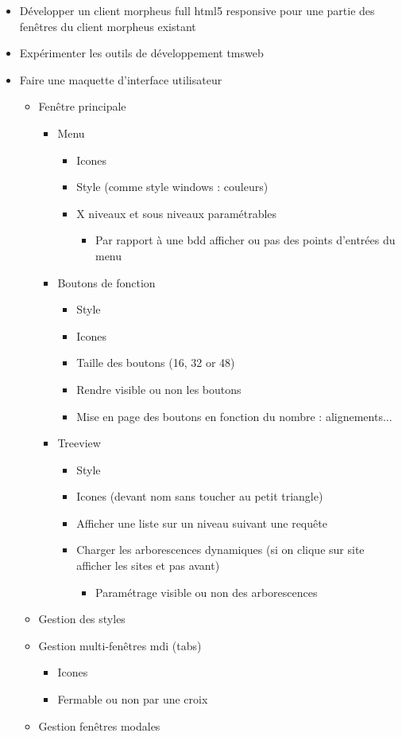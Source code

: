 \documentclass[a4paper, 12pt, french]{article}
\newcommand{\bdot}{\item[\color{ssiYellow}\ding{108}]}
\newcommand{\bdotoutlined}{\item[\color{ssiYellow}\ding{109}]}
\newcommand{\bsquare}{\item[\color{ssiYellow}\ding{110}]}
\newcommand{\bsquareoutlined}{\item[\color{ssiYellow}\ding{111}]}
\newcommand{\bdiamond}{\item[\color{ssiYellow}\ding{117}]}
\begin{document}
					\begin{itemize}
						\bdot{Développer un client morpheus full \gls{html}5 responsive pour une partie des fenêtres du client morpheus existant}
						\bdot{Expérimenter les outils de développement \gls{tmsweb}}
						\bdot{Faire une maquette d'interface utilisateur}
							\begin{itemize}
								\bdotoutlined{Fenêtre principale}
									\begin{itemize}
										\bsquare{Menu}
											\begin{itemize}
												\bsquareoutlined{Icones}
												\bsquareoutlined{Style (comme style windows : couleurs)}
												\bsquareoutlined{X niveaux et sous niveaux paramétrables}
													\begin{itemize}
														\bdiamond{Par rapport à une bdd afficher ou pas des points d'entrées du menu}
													\end{itemize}
											\end{itemize}
										\bsquare{Boutons de fonction}
											\begin{itemize}
												\bsquareoutlined{Style}
												\bsquareoutlined{Icones}
												\bsquareoutlined{Taille des boutons (16, 32 or 48)}
												\bsquareoutlined{Rendre visible ou non les boutons}
												\bsquareoutlined{Mise en page des boutons en fonction du nombre : alignements...}
											\end{itemize}
										\bsquare{Treeview}
											\begin{itemize}
												\bsquareoutlined{Style}
												\bsquareoutlined{Icones (devant nom sans toucher au petit triangle)}
												\bsquareoutlined{Afficher une liste sur un niveau suivant une requête}
												\bsquareoutlined{Charger les arborescences dynamiques (si on clique sur site afficher les sites et pas avant)}
													\begin{itemize}
														\bdiamond{Paramétrage visible ou non des arborescences}
													\end{itemize}
											\end{itemize}
									\end{itemize}
								\bdotoutlined{Gestion des styles}
								\bdotoutlined{Gestion multi-fenêtres mdi (tabs)}
									\begin{itemize}
										\bsquare{Icones}
										\bsquare{Fermable ou non par une croix}
									\end{itemize}
								\bdotoutlined{Gestion fenêtres modales}

\end{itemize}
\end{itemize}
\end{document}
